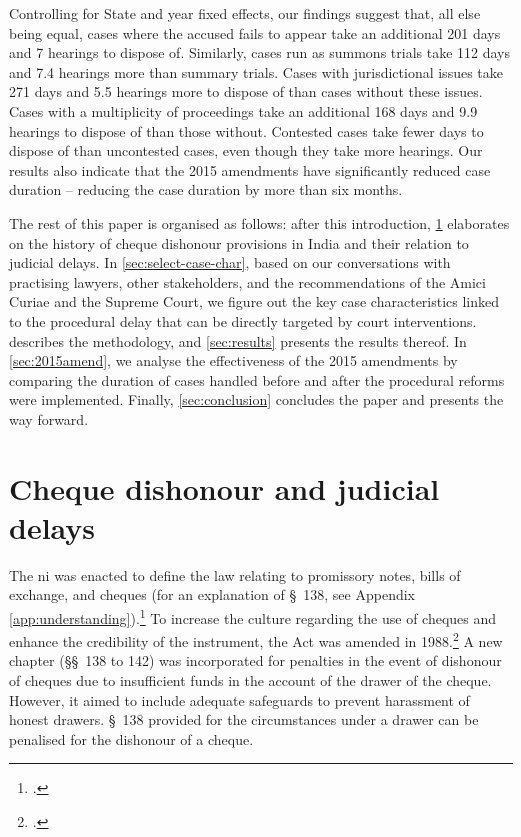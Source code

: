 Controlling for State and year fixed effects, our findings suggest that, all else being equal, cases where the accused fails to appear take an additional 201 days and 7 hearings to dispose of. Similarly, cases run as summons trials take 112 days and 7.4 hearings more than summary trials. Cases with jurisdictional issues take 271 days and 5.5 hearings more to dispose of than cases without these issues. Cases with a multiplicity of proceedings take an additional 168 days and 9.9 hearings to dispose of than those without. Contested cases take fewer days to dispose of than uncontested cases, even though they take more hearings. Our results also indicate that the 2015 amendments have significantly reduced case duration -- reducing the case duration by more than six months.

The rest of this paper is organised as follows: after this introduction, \cref{sec:history} elaborates on the history of cheque dishonour provisions in India and their relation to judicial delays. In \cref{sec:select-case-char}, based on our conversations with practising lawyers, other stakeholders, and the recommendations of the Amici Curiae and the Supreme Court, we figure out the key case characteristics linked to the procedural delay that can be directly targeted by court interventions.  describes the methodology, and \cref{sec:results} presents the results thereof. In \cref{sec:2015amend}, we analyse the effectiveness of the 2015 amendments by comparing the duration of cases handled before and after the procedural reforms were implemented. Finally, \cref{sec:conclusion} concludes the paper and presents the way forward.


\section{Cheque dishonour and judicial delays} \label{sec:history}

The \acrlong{ni} was enacted to define the law relating to promissory notes, bills of exchange, and cheques (for an explanation of \S~138, see Appendix \ref{app:understanding}).\footcite{ind1881_niAct} To increase the culture regarding the use of cheques and enhance the credibility of the instrument, the Act was amended in 1988.\footcite{niAmend1988} A new chapter (\S\S~138 to 142) was incorporated for penalties in the event of dishonour of cheques due to insufficient funds in the account of the drawer of the cheque. However, it aimed to include adequate safeguards to prevent harassment of honest drawers. \S~138 provided for the circumstances under a drawer can be penalised for the dishonour of a cheque.

